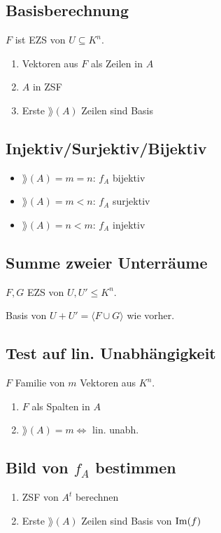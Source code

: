 \subsection*{Basisberechnung}
$F$ ist EZS von $U \subseteq K^n$.
\begin{enumerate}
	\item Vektoren aus $F$ als Zeilen in $A$
	\item $A$ in ZSF
	\item Erste $\rang(A)$ Zeilen sind Basis
\end{enumerate}

\subsection*{Injektiv/Surjektiv/Bijektiv}
\begin{itemize}
	\item $\rang(A)=m=n$: $f_A$ bijektiv
	\item $\rang(A)=m<n$: $f_A$ surjektiv
	\item $\rang(A)=n<m$: $f_A$ injektiv
\end{itemize}

\subsection*{Summe zweier Unterräume}
$F,G$ EZS von $U,U' \le K^n$.

Basis von $U+U'=\langle F \cup G \rangle$ wie vorher.

\subsection*{Test auf lin. Unabhängigkeit}
$F$ Familie von $m$ Vektoren aus $K^n$.

\begin{enumerate}
	\item $F$ als Spalten in $A$
	\item $\rang(A)=m \iff $ lin. unabh.
\end{enumerate}

\subsection*{Bild von $f_A$ bestimmen}
\begin{enumerate}
	\item ZSF von $A^t$ berechnen
	\item Erste $\rang(A)$ Zeilen sind Basis von $\operatorname{Im}(f)$
\end{enumerate}
